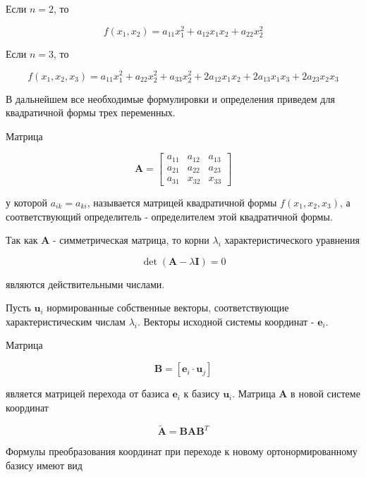 	Если $n = 2$, то 

	\[
		f \left( x_{1}, x_{2} \right) = a_{11} x^{2}_{1} + a_{12} x_{1} x_{2} + a_{22} x^{2}_{2}
	\]

	Если $n = 3$, то 

	\[
		f \left( x_{1}, x_{2}, x_{3} \right) = a_{11} x^{2}_{1} + a_{22} x^{2}_{2} + a_{33} x^{2}_{2} + 2 a_{12} x_{1} x_{2} + 2 a_{13} x_{1} x_{3} + 2 a_{23} x_{2} x_{3}
	\]

	В дальнейшем все необходимые формулировки и определения приведем для квадратичной формы трех переменных.

	Матрица

	\[
		\mathbf{A} =
		\begin{bmatrix}
			a_{11} & a_{12} & a_{13} \\
			a_{21} & a_{22} & a_{23} \\
			a_{31} & x_{32} & x_{33}
		\end{bmatrix}
	\]

	у которой $a_{ik} = a_{ki}$, называется матрицей квадратичной формы $f \left( x_{1}, x_{2}, x_{3} \right)$, а соответствующий определитель - определителем этой квадратичной формы.

	Так как $\mathbf{A}$ - симметрическая матрица, то корни $\lambda_{i}$ характеристического уравнения

	\[
		\det \left( \mathbf{A} - \lambda \mathbf{I} \right) = 0
	\]


	являются действительными числами.

	Пусть $\mathbf{u}_{i}$ нормированные собственные векторы, соответствующие характеристическим числам $\lambda_{i}$. Векторы исходной системы координат - $\mathbf{e}_{i}$.

	Матрица

	\[
		\mathbf{B} = \left[ \mathbf{e}_{i} \cdot \mathbf{u}_{j} \right]
	\]

    является матрицей перехода от базиса $\mathbf{e}_{i}$ к базису $\mathbf{u}_{i}$. Матрица $\mathbf{A}$ в новой системе координат

    \[
        \tilde{\mathbf{A}} = \mathbf{B A B}^{T}
    \]

    Формулы преобразования координат при переходе к новому ортонормированному базису имеют вид

